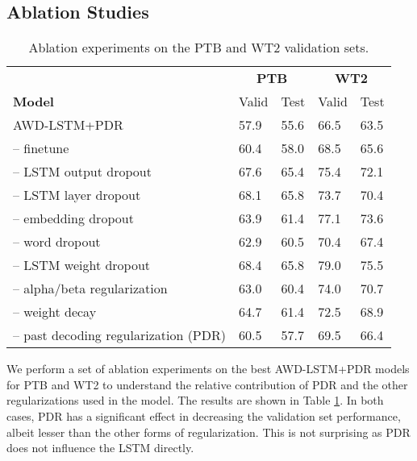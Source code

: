 \documentclass{article} \usepackage{iclr2019_conference,times}
\begin{document}
\subsection{Ablation Studies}
\begin{table}
\centering
\begin{tabular}{l|ll|ll}
\toprule
& \multicolumn{2}{|c|}{\textbf{PTB}} &  \multicolumn{2}{|c}{\textbf{WT2}} \\
\textbf{Model} & {Valid} &  { Test} &  { Valid} &  { Test}  \\
\midrule
AWD-LSTM+PDR & 57.9 & 55.6 & 66.5 & 63.5 \\
-- finetune & 60.4 & 58.0 & 68.5 & 65.6 \\
\midrule
-- LSTM output dropout & 67.6 & 65.4 & 75.4 & 72.1 \\
-- LSTM layer dropout & 68.1 & 65.8 & 73.7 & 70.4 \\ 
-- embedding dropout & 63.9 & 61.4 & 77.1 & 73.6  \\
-- word dropout & 62.9 & 60.5 & 70.4 & 67.4\\
-- LSTM weight dropout & 68.4 & 65.8 & 79.0 & 75.5 \\
-- alpha/beta regularization & 63.0 & 60.4 & 74.0 & 70.7 \\
-- weight decay & 64.7 & 61.4 & 72.5 & 68.9 \\
-- past decoding regularization (PDR) & 60.5 & 57.7 & 69.5 & 66.4 \\
\bottomrule
\end{tabular}
\caption{Ablation experiments on the PTB and WT2 validation sets.}
\label{tab:ablation}
\vspace{-1em}
\end{table}
We perform a set of ablation experiments on the best AWD-LSTM+PDR models for PTB and WT2 to understand the relative contribution of PDR and the other regularizations used in the model. The results are shown in Table \ref{tab:ablation}. In both cases, PDR has a significant effect in decreasing the validation set performance, albeit lesser than the other forms of regularization. This is not surprising as PDR does not influence the LSTM directly. 
\end{document}
